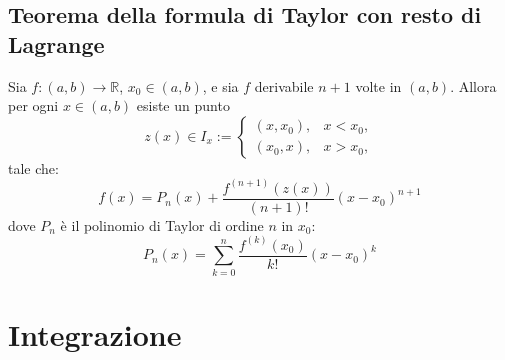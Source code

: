 \documentclass[a4paper,12pt,openright]{book}
\begin{document}
	\section{Teorema della formula di Taylor con resto di Lagrange}
	Sia $f : (a,b) \to \mathbb{R}$, $x_0 \in (a,b)$, e sia $f$ derivabile $n+1$ volte in $(a,b)$.  
	Allora per ogni $x \in (a,b)$ esiste un punto	
	\[
	z(x) \in I_x := 
	\begin{cases}
		(x, x_0), & x < x_0,\\
		(x_0, x), & x > x_0,
	\end{cases}
	\]
	tale che:
	\[f(x) = P_n(x) + \frac{f^{(n+1)}(z(x))}{(n+1)!}(x - x_0)^{n+1}\]
	dove $P_n$ è il polinomio di Taylor di ordine $n$ in $x_0$:	
	\[P_n(x) = \sum_{k=0}^{n} \frac{f^{(k)}(x_0)}{k!}(x - x_0)^k\]
	
	\chapter{Integrazione}
\end{document}
